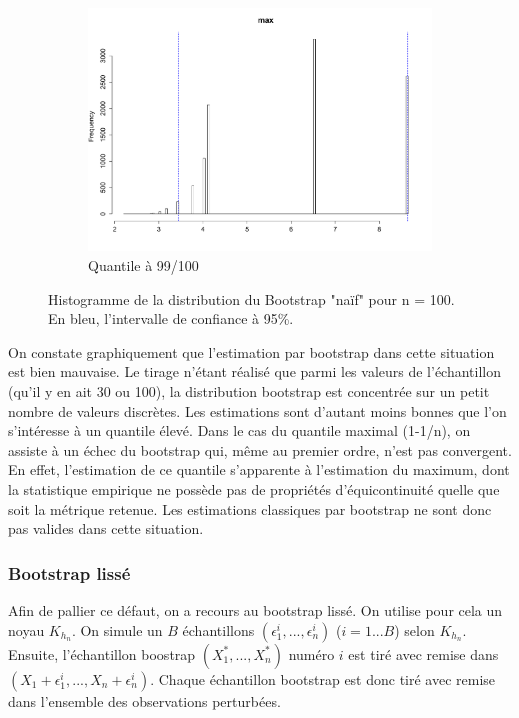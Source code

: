\documentclass{article}
\renewcommand*{\(}{ \left( }
\renewcommand*{\)}{ \right) }
\begin{document}
\begin{figure}[H]
\begin{subfigure}[t]{0.3\textwidth}
        \includegraphics[width = \linewidth]{img/BootstrapNaif-Max-100.pdf}
        \caption{Quantile à 99/100}
        \label{fig:naifcBMax}
    \end{subfigure}%
    \caption{Histogramme de la distribution du Bootstrap "naïf" pour n = 100. En bleu, l'intervalle de confiance à 95\%.}
    \label{fig:naifB100}
\end{figure}

On constate graphiquement que l'estimation par bootstrap dans cette situation est bien mauvaise. Le tirage n'étant réalisé que parmi les valeurs de l'échantillon (qu'il y en ait 30 ou 100), la distribution bootstrap est concentrée sur un petit nombre de valeurs discrètes. Les estimations sont d'autant moins bonnes que l'on s'intéresse à un quantile élevé. Dans le cas du quantile maximal (1-1/n), on assiste à un échec du bootstrap qui, même au premier ordre, n'est pas convergent. En effet, l'estimation de ce quantile s'apparente à l'estimation du maximum, dont la statistique empirique ne possède pas de propriétés d'équicontinuité quelle que soit la métrique retenue. Les estimations classiques par bootstrap ne sont donc pas valides dans cette situation.



\subsubsection{Bootstrap lissé}
Afin de pallier ce défaut, on a recours au bootstrap lissé. On utilise pour cela un noyau $K_{h_n}$. On simule un $B$ échantillons $(\epsilon^{i}_1, ..., \epsilon^{i}_n)$ ($i=1...B$) selon $K_{h_n}$. Ensuite, l'échantillon boostrap $(X^*_1, ..., X^*_n)$ numéro $i$ est tiré avec remise dans $(X_1+\epsilon^{i}_1, ...,X_n+ \epsilon^{i}_n)$. Chaque échantillon bootstrap est donc tiré avec remise dans l'ensemble des observations perturbées.\\
\end{document}
